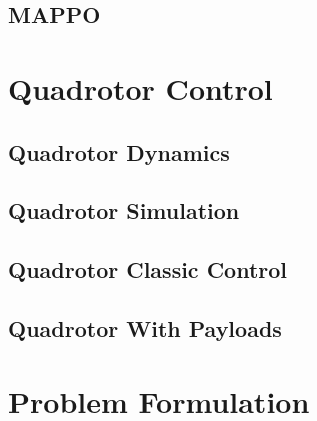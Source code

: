 
\subsection{MAPPO}

\section{Quadrotor Control}
\subsection{Quadrotor Dynamics}
\subsection{Quadrotor Simulation}
\subsection{Quadrotor Classic Control}
\subsection{Quadrotor With Payloads}

\section{Problem Formulation}


